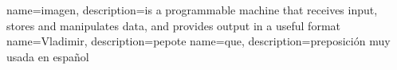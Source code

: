 {
  name={imagen},
  description={is a programmable machine that receives input,
               stores and manipulates data, and provides
               output in a useful format}
}
{
  name={Vladimir},
  description={pepote}
}
{
  name={que},
  description={preposición muy usada en español}
}